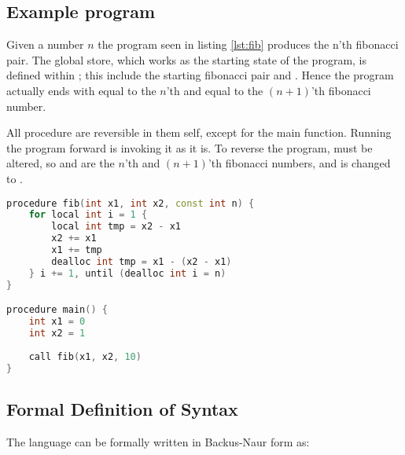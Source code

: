 \subsection*{Example program \rr}
Given a number $n$ the program seen in listing \ref{lst:fib} produces the n'th fibonacci
pair. The global store, which works as the starting state of the program, is defined within
; this include the starting fibonacci pair
 and . Hence the program actually ends with  equal to the $n$'th
and  equal to the $(n+1)$'th fibonacci number.

All \lan procedure are reversible in them self, except for the main function. Running the program
forward is invoking it as it is. To reverse the program,  must be altered, so
 and  are the $n$'th and $(n+1)$'th fibonacci numbers, and
 is changed to .

\begin{lstlisting}[language=C++, label={lst:fib}, caption={Program finding the \lsin{n}'th fibonacci number.}]
procedure fib(int x1, int x2, const int n) {
    for local int i = 1 {
        local int tmp = x2 - x1
        x2 += x1
        x1 += tmp
        dealloc int tmp = x1 - (x2 - x1)
    } i += 1, until (dealloc int i = n)
}

procedure main() {
    int x1 = 0
    int x2 = 1
    
    call fib(x1, x2, 10)
}
\end{lstlisting}


\subsection{Formal Definition of Syntax \rr}
The language \lan can be formally written in Backus-Naur form as:

